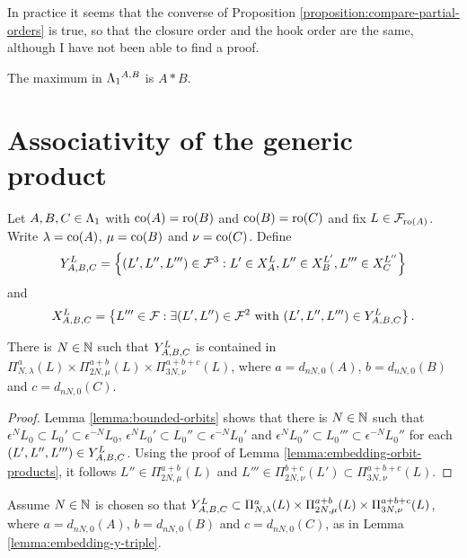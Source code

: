 \documentclass[a4paper, 11pt]{report}
\begin{document}
\begin{remark}
In practice it seems that the converse of Proposition \ref{proposition:compare-partial-orders} is true, so that the closure order and the hook order are the same, although I have not been able to find a proof.
\end{remark}

\begin{corollary}
The maximum in $\matrices^{A,B}$ is $A\ast B$.
\end{corollary}


\section{Associativity of the generic product}

Let $A,B,C\in\matrices$ with $\co{A}=\ro{B}$ and $\co{B}=\ro{C}$ and fix $L\in\flags_{\ro{A}}$. Write $\lambda=\co{A}$, $\mu=\co{B}$ and $\nu=\co{C}$. Define
\begin{equation*}
\yprod[L]{A,B,C} = \left\{(L',L'',L''')\in\flags^3: L'\in\xprod[L]{A}, L''\in\xprod[L']{B}, L'''\in\xprod[L'']{C}\right\}
\end{equation*}
and
\begin{equation*}
\xprod[L]{A,B,C} = \left\{L'''\in\flags: \exists (L',L'')\in\flags^2 \text{ with } (L',L'',L''')\in\yprod[L]{A,B,C}\right\}.
\end{equation*}

\begin{lemma}\label{lemma:embedding-y-triple}
There is $N\in\naturals$ such that $\yprod[L]{A,B,C}$ is contained in $\Pi_{N,\lambda}^a(L)\times\Pi_{2N,\mu}^{a+b}(L)\times\Pi_{3N,\nu}^{a+b+c}(L)$, where $a=d_{nN,0}{(A)}$, $b=d_{nN,0}{(B)}$ and $c=d_{nN,0}{(C)}$.
\end{lemma}

\begin{proof}
Lemma \ref{lemma:bounded-orbits} shows that there is $N\in\naturals$ such that $\epsilon^N L_0\subset L_0'\subset\epsilon^{-N}L_0$, $\epsilon^N L_0'\subset L_0''\subset\epsilon^{-N}L_0'$ and $\epsilon^N L_0''\subset L_0'''\subset\epsilon^{-N}L_0''$ for each $(L',L'',L''')\in\yprod[L]{A,B,C}$. Using the proof of Lemma \ref{lemma:embedding-orbit-products}, it follows $L''\in\Pi_{2N,\mu}^{a+b}(L)$ and $L'''\in\Pi_{2N,\nu}^{b+c}(L')\subset\Pi_{3N,\nu}^{a+b+c}(L)$.
\end{proof}

Assume $N\in\naturals$ is chosen so that $\yprod[L]{A,B,C}\subset\Pi_{N,\lambda}^a(L)\times\Pi_{2N,\mu}^{a+b}(L)\times\Pi_{3N,\nu}^{a+b+c}(L)$, where $a=d_{nN,0}{(A)}$, $b=d_{nN,0}{(B)}$ and $c=d_{nN,0}{(C)}$, as in Lemma \ref{lemma:embedding-y-triple}.
\end{document}
